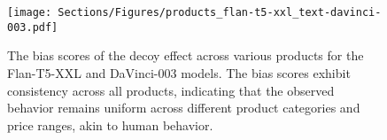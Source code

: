 \begin{figure}[t!]
\centering
\texttt{[image: Sections/Figures/products\_flan-t5-xxl\_text-davinci-003.pdf]}
\caption{The bias scores of the decoy effect across various products for the Flan-T5-XXL and DaVinci-003 models. The bias scores exhibit consistency across all products, indicating that the observed behavior remains uniform across different product categories and price ranges, akin to human behavior.}
\label{fig:products}
\end{figure}
